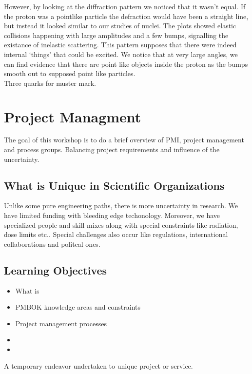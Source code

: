 \documentclass[english, 11pt]{article}
\begin{document}
    However, by looking at the diffraction pattern we noticed that it wasn't equal. If the proton was a pointlike particle the defraction would have been a straight line, but instead it looked similar to our studies of nuclei. The plots showed elastic collisions happening with large amplitudes and a few bumps, signalling the existance of inelastic scattering. This pattern supposes that there were indeed internal `things' that could be excited. We notice that at very large angles, we can find evidence that there are point like objects inside the proton as the bumps smooth out to supposed point like particles.\\

    Three quarks for muster mark. 

    \section{Project Managment}
      The goal of this workshop is to do a brief overview of PMI, project management and process groups. Balancing project requirements and influence of the uncertainty. 

    \subsection*{What is Unique in Scientific Organizations}
      Unlike some pure engineering paths, there is more uncertainty in research. We have limited funding with bleeding edge techonology. Moreover, we have specialized people and skill mixes along with special constraints like radiation, dose limits etc.. Special challenges also occur like regulations, international collaborations and politcal ones.

    \subsection*{Learning Objectives}
      \begin{itemize}
        \item What is 
        \item PMBOK knowledge areas and constraints
        \item Project management processes
        \item {}
        \item {}
      \end{itemize}

      \begin{defn}[Project]\label{project}
        A temporary endeavor undertaken to unique project or service.
      \end{defn}
\end{document}
